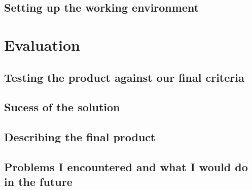 \documentclass[9pt]{article}
\begin{document}
\newpage
\subsection{Setting up the working environment}








\newpage
\section{Evaluation}












\newpage
\subsection{Testing the product against our final criteria}











\newpage
\subsection{Sucess of the solution}











\newpage
\subsection{Describing the final product}












\newpage
\subsection{Problems I encountered and what I would do in the future}











\newpage
{}

\end{document}
